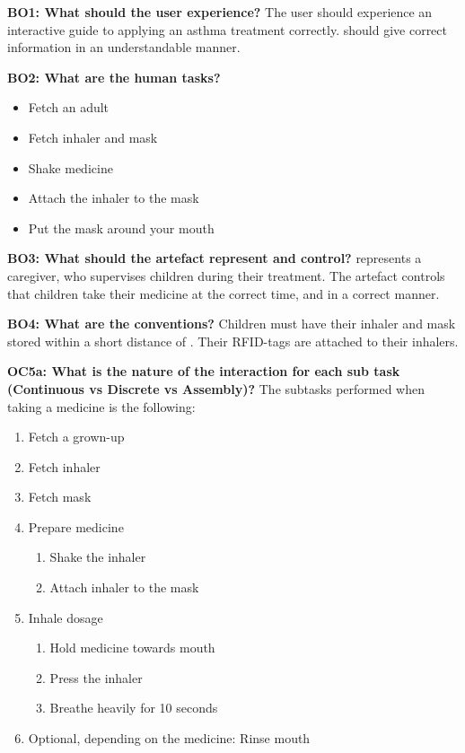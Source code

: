 \textbf{BO1: What should the user experience?}
The user should experience an interactive guide to applying an asthma treatment correctly. \buddy{} should give correct information in an understandable manner. 


\textbf{BO2: What are the human tasks?}
\begin{itemize}
  \item Fetch an adult
  \item Fetch inhaler and mask
  \item Shake medicine
  \item Attach the inhaler to the mask
  \item Put the mask around your mouth
\end{itemize}

\textbf{BO3: What should the artefact represent and control?}
\buddy{} represents a caregiver, who supervises children during their treatment. The artefact controls that children take their medicine at the correct time, and in a correct manner.   

\textbf{BO4: What are the conventions?}
Children must have their inhaler and mask stored within a short distance of \buddy{}. Their RFID-tags are attached to their inhalers.    

\textbf{OC5a: What is the nature of the interaction for each sub task (Continuous vs Discrete vs Assembly)?}
The subtasks performed when taking a medicine is the following:
\begin{enumerate}
  \item Fetch a grown-up
  \item Fetch inhaler
  \item Fetch mask
  \item Prepare medicine
  	\begin{enumerate}
  	  \item Shake the inhaler
  	  \item Attach inhaler to the mask
  	 \end{enumerate}
  \item Inhale dosage
  	\begin{enumerate}
  	  \item Hold medicine towards mouth
  	  \item Press the inhaler
  	  \item Breathe heavily for 10 seconds
  	 \end{enumerate}
  \item Optional, depending on the medicine: Rinse mouth
\end{enumerate}

